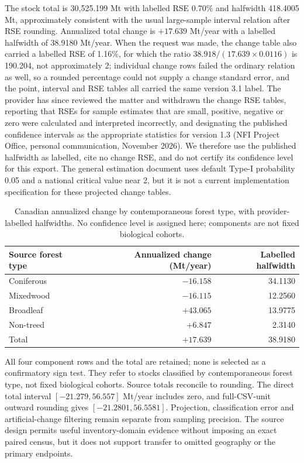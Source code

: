 The stock total is 30,525.199 Mt with labelled RSE 0.70\% and halfwidth 418.4005 Mt, approximately consistent with the usual large-sample interval relation after RSE rounding. Annualized total change is $+17.639$ Mt/year with a labelled halfwidth of 38.9180 Mt/year. When the request was made, the change table also carried a labelled RSE of 1.16\%, for which the ratio $38.918/(17.639\times0.0116)$ is 190.204, not approximately 2; individual change rows failed the ordinary relation as well, so a rounded percentage could not supply a change standard error, and the point, interval and RSE tables all carried the same version 3.1 label. The provider has since reviewed the matter and withdrawn the change RSE tables, reporting that RSEs for sample estimates that are small, positive, negative or zero were calculated and interpreted incorrectly, and designating the published confidence intervals as the appropriate statistics for version 1.3 (NFI Project Office, personal communication, November 2026). We therefore use the published halfwidth as labelled, cite no change RSE, and do not certify its confidence level for this export. The general estimation document uses default Type-I probability 0.05 and a national critical value near 2, but it is not a current implementation specification for these projected change tables.

\begin{table}[htbp]\centering\small
\caption{Canadian annualized change by contemporaneous forest type, with provider-labelled halfwidths. No confidence level is assigned here; components are not fixed biological cohorts.}\label{tab:SI_Canada_components}
\begin{tabular}{lrr}\toprule
Source forest type & Annualized change (Mt/year) & Labelled halfwidth\\\midrule
Coniferous & $-16.158$ & 34.1130\\
Mixedwood & $-16.115$ & 12.2560\\
Broadleaf & $+43.065$ & 13.9775\\
Non-treed & $+6.847$ & 2.3140\\
Total & $+17.639$ & 38.9180\\\bottomrule
\end{tabular}\end{table}

All four component rows and the total are retained; none is selected as a confirmatory sign test. They refer to stocks classified by contemporaneous forest type, not fixed biological cohorts. Source totals reconcile to rounding. The direct total interval $[-21.279,56.557]$ Mt/year includes zero, and full-CSV-unit outward rounding gives $[-21.2801,56.5581]$. Projection, classification error and artificial-change filtering remain separate from sampling precision. The source design permits useful inventory-domain evidence without imposing an exact paired census, but it does not support transfer to omitted geography or the primary endpoints.

